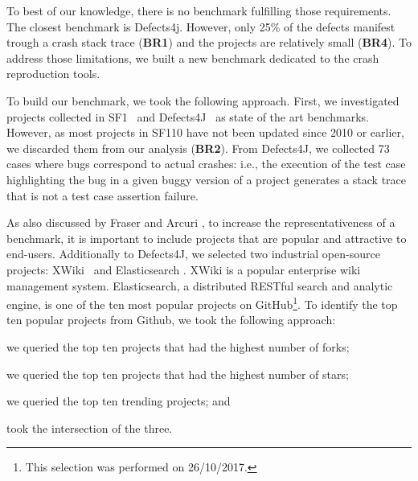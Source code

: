 To best of our knowledge, there is no benchmark fulfilling those requirements. The closest benchmark is Defects4j. However, only 25\% of the defects manifest trough a crash stack trace (\textbf{BR1}) and the projects are relatively small (\textbf{BR4}). To address those limitations, we built a new benchmark dedicated to the crash reproduction tools.


To build our benchmark, we took the following approach.
First, we investigated projects collected in SF1~\cite{Fraser2014b} and Defects4J~\cite{just2014defects4j} as state of the art benchmarks.
However, as most projects in SF110 have not been updated since 2010 or earlier, we discarded them from our analysis (\textbf{BR2}).
%
From Defects4J, we collected 73 cases where bugs correspond to actual crashes: i.e., the execution of the test case highlighting the bug in a given buggy version of a project generates a stack trace that is not a test case assertion failure. 

As also discussed by Fraser and Arcuri \cite{Fraser2014b}, to increase the representativeness of a benchmark, it is important to include projects that are popular and attractive to end-users.
Additionally to Defects4J, we selected two industrial open-source projects: XWiki~\cite{xwiki} and Elasticsearch \cite{elasticsearch}.
XWiki is a popular enterprise wiki management system.
Elasticsearch, a distributed RESTful search and analytic engine, is one of the ten most popular projects on GitHub\footnote{This selection was performed on 26/10/2017.}.
To identify the top ten popular projects from Github, we took the following approach:
%
\begin{inparaenum}[(i)]
\item we queried the top ten projects that had the highest number of forks;
\item we queried the top ten projects that had the highest number of stars;
\item we queried the top ten trending projects; and
\item took the intersection of the three.
\end{inparaenum}

